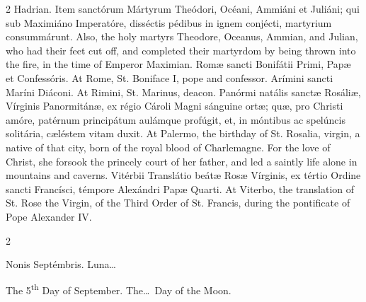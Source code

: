 \begin{paracol}{2}
 Hadrian.
\switchcolumn*
{}
Item sanctórum Mártyrum 
 Theódori, Océani, Ammiáni et Juliáni; qui sub Maximiáno Imperatóre, 
 disséctis pédibus in ignem conjécti, martyrium consummárunt.
\switchcolumn
{}
Also, the holy martyrs Theodore, 
 Oceanus, Ammian, and Julian, who had their feet cut off, and completed their 
 martyrdom by being thrown into the fire, in the time of Emperor Maximian.
\switchcolumn*
{}
Romæ sancti Bonifátii 
 Primi, Papæ et Confessóris.
\switchcolumn
{}
At Rome, St. Boniface I, pope and 
 confessor.
\switchcolumn*
{}
Arímini sancti Maríni 
 Diáconi.
\switchcolumn
{}
At Rimini, St. Marinus, deacon.
\switchcolumn*
{}
Panórmi natális sanctæ 
 Rosáliæ, Vírginis Panormitánæ, ex régio Cároli Magni sánguine ortæ; quæ, pro 
 Christi amóre, patérnum principátum aulámque profúgit, et, in móntibus ac 
 spelúncis solitária, cæléstem vitam duxit.
\switchcolumn
{}
At Palermo, the birthday of St. 
 Rosalia, virgin, a native of that city, born of the royal blood of 
 Charlemagne. For the love of Christ, she forsook the princely court of 
 her father, and led a saintly life alone in mountains and caverns.
\switchcolumn*
{}
Vitérbii Translátio 
 beátæ Rosæ Vírginis, ex tértio Ordine sancti Francísci, témpore Alexándri 
 Papæ Quarti.
\switchcolumn
{}
At Viterbo, the translation of St. 
 Rose the Virgin, of the Third Order of St. Francis, during the pontificate 
 of Pope Alexander IV.
\switchcolumn*
{}
\end{paracol}


\begin{paracol}{2}
\begin{center}{\color{gregoriocolor} Nonis Septémbris. 
 Luna\dots\ }\end{center}
\switchcolumn
{}
\begin{center}{\color{gregoriocolor} The   5\textsuperscript{th} Day of 
 September. The\dots\ Day of the Moon.}\end{center}
\end{paracol}


